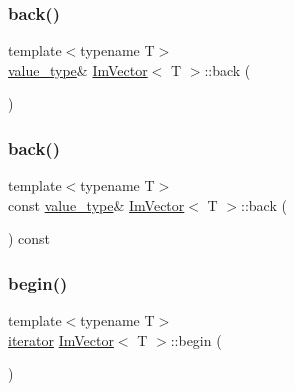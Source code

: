 \hypertarget{class_im_vector_a3e4424d3fca190894598a6575f9d2401}{}\label{class_im_vector_a3e4424d3fca190894598a6575f9d2401} 
\subsubsection{\texorpdfstring{back()}{back()}\hspace{0.1cm}{\footnotesize\ttfamily [1/2]}}
{\footnotesize\ttfamily template$<$typename T$>$ \\
\hyperlink{class_im_vector_a8bd77e4e7581d8e5f9e98d7c2f3c2a80}{value\+\_\+type}\& \hyperlink{class_im_vector}{Im\+Vector}$<$ T $>$\+::back (\begin{DoxyParamCaption}{ }\end{DoxyParamCaption})}

\hypertarget{class_im_vector_a6f22918d4f139a1c4c3410ccae726f81}{}\label{class_im_vector_a6f22918d4f139a1c4c3410ccae726f81} 
\subsubsection{\texorpdfstring{back()}{back()}\hspace{0.1cm}{\footnotesize\ttfamily [2/2]}}
{\footnotesize\ttfamily template$<$typename T$>$ \\
const \hyperlink{class_im_vector_a8bd77e4e7581d8e5f9e98d7c2f3c2a80}{value\+\_\+type}\& \hyperlink{class_im_vector}{Im\+Vector}$<$ T $>$\+::back (\begin{DoxyParamCaption}{ }\end{DoxyParamCaption}) const}

\hypertarget{class_im_vector_a300a8b559cd87a78063046ef81151bce}{}\label{class_im_vector_a300a8b559cd87a78063046ef81151bce} 
\subsubsection{\texorpdfstring{begin()}{begin()}\hspace{0.1cm}{\footnotesize\ttfamily [1/2]}}
{\footnotesize\ttfamily template$<$typename T$>$ \\
\hyperlink{class_im_vector_a74b5478f1f6fd471cc71219bce483db6}{iterator} \hyperlink{class_im_vector}{Im\+Vector}$<$ T $>$\+::begin (\begin{DoxyParamCaption}{ }\end{DoxyParamCaption})}

